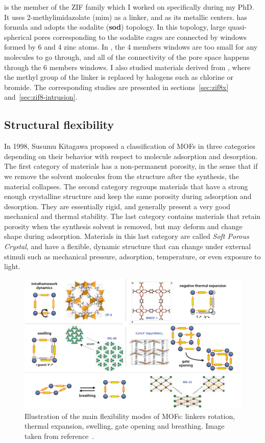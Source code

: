 \documentclass[thesis]{subfiles}
\begin{document}
 is the member of the ZIF family which I worked on specifically during my
PhD. It uses 2-methylimidazolate (mim) as a linker, and  as its
metallic centers.  has formula  and adopts the sodalite
(\textbf{sod}) topology. In this topology, large quasi-spherical pores
corresponding to the sodalite cages are connected by windows formed by 6 and 4
zinc atoms. In , the 4 members windows are too small for any molecules to
go through, and all of the connectivity of the pore space happens through the 6
members windows. I also studied materials derived from , where the methyl
group of the linker is replaced by halogens such as chlorine or bromide. The
corresponding studies are presented in sections~\ref{sec:zif8x}
and~\ref{sec:zif8-intrusion}.

\newpage
\subsection{Structural flexibility}

In 1998, Susumu Kitagawa proposed a classification of MOFs in three
categories\cite{Horike2009} depending on their behavior with respect to
molecule adsorption and desorption. The first category of materials has a
non-permanent porosity, in the sense that if we remove the solvent molecules
from the structure after the synthesis, the material collapses. The second
category regroups materials that have a strong enough crystalline structure and
keep the same porosity during adsorption and desorption. They are essentially
rigid, and generally present a very good mechanical and thermal stability. The
last category contains materials that retain porosity when the synthesis solvent
is removed, but may deform and change shape during adsorption. Materials in this
last category are called \emph{Soft Porous Crystal}, and have a flexible,
dynamic structure that can change under external stimuli such as mechanical
pressure, adsorption, temperature, or even exposure to light\cite{Kitagawa2005,
Coudert2015}.

\begin{figure}[ht]
    \centering
    \includegraphics[width=\textwidth]{figures/cited/mof-flexibility}
    \caption{Illustration of the main flexibility modes of MOFs: linkers
    rotation, thermal expansion, swelling, gate opening and breathing. Image
    taken from reference~\cite{Coudert2011}.}
    \label{fig:mof-flexibility}
\end{figure}
\end{document}
